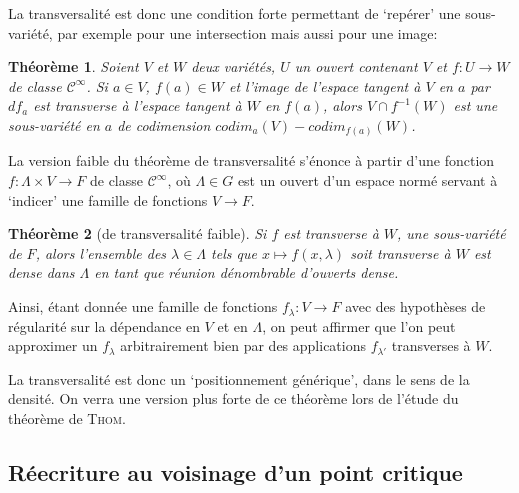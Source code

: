 \documentclass{article}
\newcommand{\cinf}{\mathcal{C}^\infty}
\newtheorem{thm}{Théorème}
\theoremstyle{definition}
\newtheorem{defn}{Définition}
\begin{document}
La transversalité est donc une condition forte permettant de `repérer' une sous-variété, par exemple pour une intersection mais aussi pour une image:

\begin{thm}
	Soient $V$ et $W$ deux variétés, $U$ un ouvert contenant $V$ et $f:U\to W$ de classe $\cinf$.
	Si $a\in V$, $f(a)\in W$ et l'image de l'espace tangent à $V$ en $a$ par $df_a$ est transverse à l'espace tangent à $W$ en $f(a)$, alors $V\cap f^{-1}(W)$ est une sous-variété en $a$ de codimension $codim_a(V) - codim_{f(a)}(W)$.
\end{thm}

\iffalse
\begin{defn}
	Une application $f$ est dite \textbf{structurellement stable} si pour toute application $p$ suffisament proche de 0 (et infiniment continue), $f+p$ a le même type de point critique que $f$ à translation près.
\end{defn}

Un point critique est en fait structurellement stable si et seulement si il est non dégénéré.
La \textbf{stabilité structurelle} signifie plus généralement que le comportement qualitatif ne change pas malgré une perturbation suffisament petite.
\fi

La version faible du théorème de transversalité s'énonce à partir d'une fonction $f: \Lambda\times V\to F$ de classe $\cinf$, où $\Lambda\in G$ est un ouvert d'un espace normé servant à `indicer' une famille de fonctions $V\to F$.

\begin{thm}[de transversalité faible]
	Si $f$ est transverse à $W$, une sous-variété de $F$, alors l'ensemble des $\lambda\in\Lambda$ tels que $x\mapsto f(x,\lambda)$ soit transverse à $W$ est dense dans $\Lambda$ en tant que réunion dénombrable d'ouverts dense.
\end{thm}

Ainsi, étant donnée une famille de fonctions $f_\lambda: V\to F$ avec des hypothèses de régularité sur la dépendance en $V$ et en $\Lambda$, on peut affirmer que l'on peut approximer un $f_\lambda$ arbitrairement bien par des applications $f_{\lambda'}$ transverses à $W$.

La transversalité est donc un `positionnement générique', dans le sens de la densité. On verra une version plus forte de ce théorème lors de l'étude du théorème de \textsc{Thom}.

\subsection{Réecriture au voisinage d'un point critique}
\end{document}
